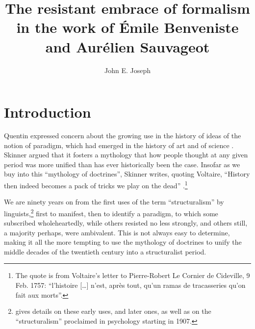 \documentclass[output=paper]{langscibook}
\author{John E. Joseph \affiliation{University of Edinburgh}}
\title{The resistant embrace of formalism in the work of Émile Benveniste and Aurélien Sauvageot}
\begin{document}
\maketitle

\section{Introduction}
\label{sec:joseph:intro}

Quentin \citet{Skinner1969} expressed concern about the growing use in the history of ideas of the notion of paradigm, which had emerged in the history of art \citep{Gombrich1960} and of science \citep{Kuhn1962}. Skinner argued that it fosters a mythology that how people thought at any given period was more unified than has ever historically been the case. Insofar as we buy into this ``mythology of doctrines'', Skinner writes, quoting Voltaire, ``History then indeed becomes a pack of tricks we play on the dead'' \citep[7, 13--14]{Skinner1969}.\footnote{The quote is from Voltaire's letter to Pierre-Robert Le Cornier de Cideville, 9 Feb. 1757: ``l'histoire […] n'est, après tout, qu'un ramas de tracasseries qu'on fait aux morts''.} 

We are ninety years on from the first uses of the term ``structuralism'' by linguists,\footnote{\citet{Joseph2001} gives details on these early uses, and later ones, as well as on the ``structuralism'' proclaimed in psychology starting in 1907.} first to manifest, then to identify a paradigm, to which some subscribed wholeheartedly, while others resisted no less strongly, and others still, a majority perhaps, were ambivalent. This is not always easy to determine, making it all the more tempting to use the mythology of doctrines to unify the middle decades of the twentieth century into a structuralist period.
\end{document}
